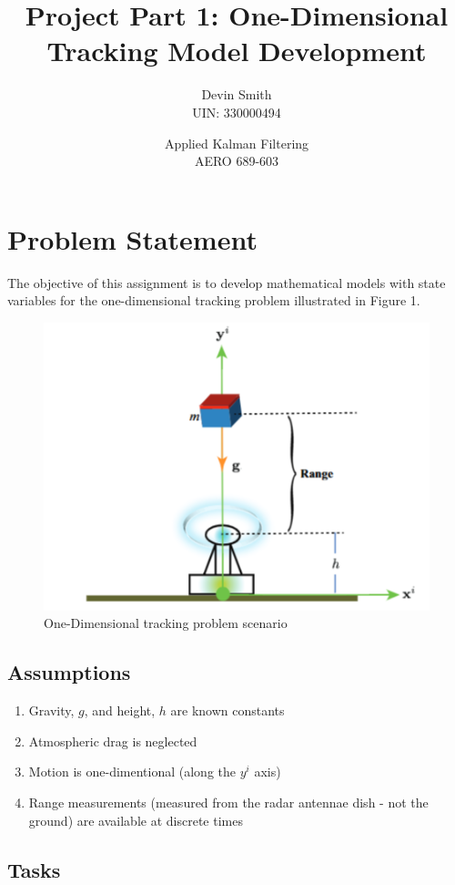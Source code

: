 \documentclass{article}
\title{Project Part 1: One-Dimensional Tracking Model Development}
\author{Devin Smith \\ UIN: 330000494}
\date{Applied Kalman Filtering\\AERO 689-603}
\begin{document}
\maketitle

\section{Problem Statement}

The objective of this assignment is to develop mathematical models with state variables for the one-dimensional tracking problem illustrated in Figure 1.
\begin{figure}[h]
    \centering
    \includegraphics[width=0.75\linewidth]{Figure_1.png}
    \caption{One-Dimensional tracking problem scenario}
    \label{fig:enter-label}
\end{figure}

\subsection{Assumptions}

\begin{enumerate}
    \item Gravity, \textbf{$g$}, and height, \textit{$h$} are known constants
    \item Atmospheric drag is neglected
    \item Motion is one-dimentional (along the \textbf{$y^i$} axis)
    \item Range measurements (measured from the radar antennae dish - not the ground) are available at discrete times
\end{enumerate}

\subsection{Tasks}
\end{document}
